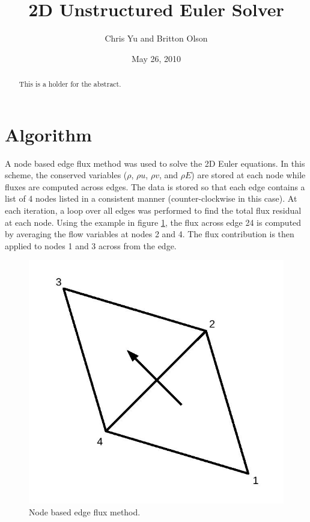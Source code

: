 \documentclass[12pt]{article}
\newcommand{\smalltitle}[2]{ 
 	#1
	\raggedright
	#2
}
\begin{document}
 \title{2D Unstructured Euler Solver}
 \author{Chris Yu and Britton Olson}
 \date{May 26, 2010}
 \maketitle


 \begin{abstract}
 This is a holder for the abstract.
 \end{abstract}


 \section{Algorithm}

 A node based edge flux method was used to solve the 2D Euler equations. In this scheme, the conserved variables ($\rho$, $\rho u$, $\rho v$, and $\rho E$) are stored at each node while fluxes are computed across edges. The data is stored so that each edge contains a list of 4 nodes listed in a consistent manner (counter-clockwise in this case). At each iteration, a loop over all edges was performed to find the total flux residual at each node. Using the example in figure \ref{scheme}, the flux across edge 24 is computed by averaging the flow variables at nodes 2 and 4. The flux contribution is then applied to nodes 1 and 3 across from the edge.  

 \begin{figure}[htbp]
 \begin{center}
 \includegraphics[scale=0.25]{figs/triangle.jpg}
 \caption{Node based edge flux method.} \label{scheme}
 \end{center}
 \end{figure}
\end{document}
